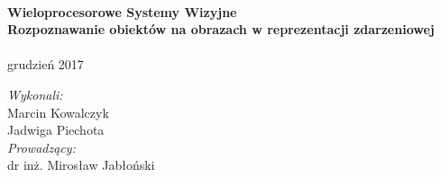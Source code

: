 \begin{titlepage}
\HRule \\[0.4cm]
{ \huge \bfseries Wieloprocesorowe Systemy Wizyjne\\[1cm]Rozpoznawanie obiektów na obrazach w reprezentacji zdarzeniowej}\\[0.4cm] %
\HRule \\[1cm]%
 



{\large grudzień 2017}\\[1.5cm] %



\begin{flushleft}
\Large
\emph{Wykonali:}\\
Marcin Kowalczyk\\
Jadwiga Piechota\\[1cm]

 \emph{Prowadzący:}\\
dr inż. Mirosław Jabłoński\\[3cm] %
 
\end{flushleft}
\end{titlepage}
\clearpage
\setcounter{page}{2}